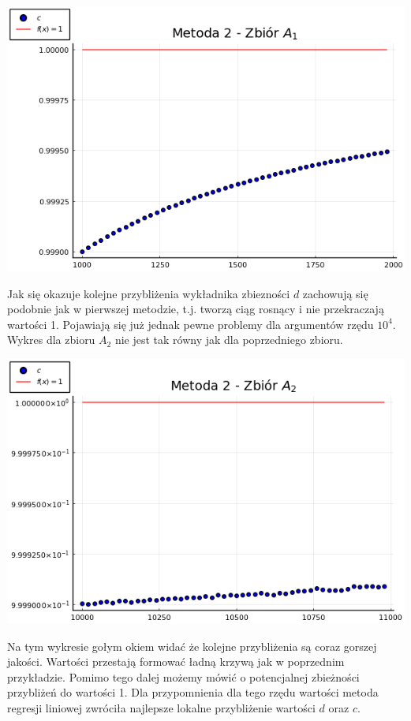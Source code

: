 \documentclass[11pt,wide]{mwart}
\begin{document}
\vspace{1cm}
\centerline{\includegraphics[scale=0.8]{chart2_1}}
\vspace{1cm}

Jak się okazuje kolejne przybliżenia wykładnika zbiezności $d$ zachowują się podobnie jak w pierwszej metodzie,
t.j. tworzą ciąg rosnący i nie przekraczają wartości 1.
Pojawiają się już jednak pewne problemy dla argumentów rzędu $10^4$.
Wykres dla zbioru $A_2$ nie jest tak równy jak dla poprzedniego zbioru.

\vspace{1cm}
\centerline{\includegraphics[scale=0.8]{chart2_2}}
\vspace{1cm}

Na tym wykresie gołym okiem widać że kolejne przybliżenia są coraz gorszej jakości. Wartości przestają formować ładną krzywą jak w poprzednim przykładzie.
Pomimo tego dalej możemy mówić o potencjalnej zbieżności przybliżeń do wartości 1.
Dla przypomnienia dla tego rzędu wartości metoda regresji liniowej zwróciła najlepsze lokalne przybliżenie wartości $d$ oraz $c$.
\end{document}
